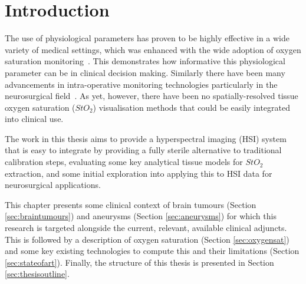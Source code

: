 \chapter{Introduction}
\label{chap:intro}
\minitoc

The use of physiological parameters has proven to be highly effective in a wide variety of medical settings, which was enhanced with the wide adoption of oxygen saturation monitoring~\citep{Williams2022}. This demonstrates how informative this physiological parameter can be in clinical decision making. Similarly there have been many advancements in intra-operative monitoring technologies particularly in the neurosurgical field~\citep{Raith2020}. As yet, however, there have been no spatially-resolved tissue oxygen saturation ($StO_2$) visualisation methods that could be easily integrated into clinical use. 

The work in this thesis aims to provide a hyperspectral imaging (HSI) system that is easy to integrate by providing a fully sterile alternative to traditional calibration steps, evaluating some key analytical tissue models for $StO_2$ extraction, and some initial exploration into applying this to HSI data for neurosurgical applications. 

This chapter presents some clinical context of brain tumours (Section \ref{sec:braintumours}) and aneurysms (Section \ref{sec:aneurysms}) for which this research is targeted alongside the current, relevant, available clinical adjuncts. This is followed by a description of oxygen saturation (Section \ref{sec:oxygensat}) and some key existing technologies to compute this and their limitations (Section \ref{sec:stateofart}). Finally, the structure of this thesis is presented in Section \ref{sec:thesisoutline}.

%
